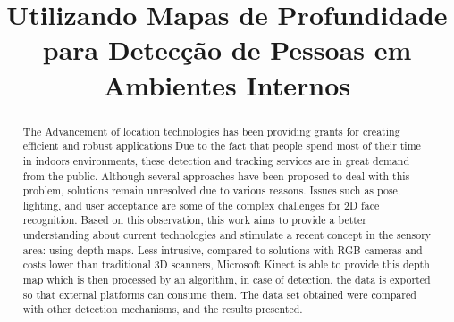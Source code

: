 \documentclass[conference]{IEEEtran}
\begin{document}
\title{Utilizando Mapas de Profundidade para Detecção de Pessoas em Ambientes Internos}

\author{

\and
{}
}

\maketitle

{
\begin{abstract}
The Advancement of location technologies has been providing grants for creating efficient and robust applications
Due to the fact that people spend most of their time in indoors environments, these detection and tracking services are in great demand from the public. Although several approaches have been proposed to deal with this problem, solutions remain unresolved due to various reasons. Issues such as pose, lighting, and user acceptance are some of the complex challenges for 2D face recognition. Based on this observation, this work aims to provide a better understanding about current technologies and stimulate a recent concept in the sensory area: using depth maps. Less intrusive, compared to solutions with RGB cameras and costs lower than traditional 3D scanners, Microsoft Kinect is able to provide this depth map which is then processed by an algorithm, in case of detection, the data is exported so that external platforms can consume them. The data set obtained were compared with other detection mechanisms, and the results presented.
\end{abstract}}
\end{document}
